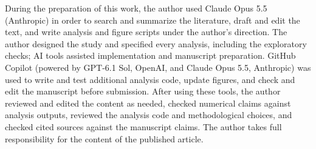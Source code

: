 During the preparation of this work, the author used Claude Opus 5.5 (Anthropic) in order to search and summarize the
literature, draft and edit the text, and write analysis and figure scripts under the author's direction.
The author designed the study and specified every analysis, including the exploratory checks; AI tools assisted
implementation and manuscript preparation.
GitHub Copilot (powered by GPT-6.1 Sol, OpenAI, and Claude Opus 5.5, Anthropic) was used to write and test
additional analysis code, update figures,
and check and edit the manuscript before submission. After using these tools, the author reviewed and edited
the content as needed, checked numerical claims against analysis outputs, reviewed the analysis code and
methodological choices, and checked cited sources against the manuscript claims.
The author takes full responsibility for the content of the
published article.
